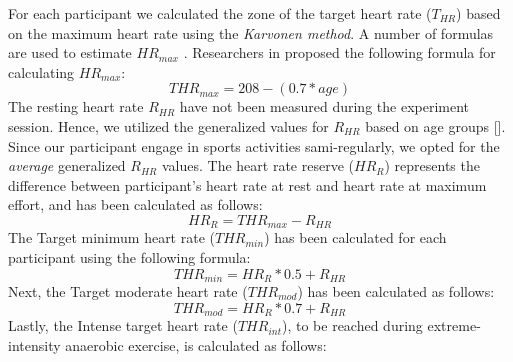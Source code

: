 For each participant we calculated the zone of the target heart rate (\begin{math} T_{HR}\end{math}) based on the maximum heart rate using the \textit{Karvonen method}. A number of formulas are used to estimate  \begin{math} HR_{max}\end{math} \cite{heartRate}. Researchers in \cite{tanaka2001age} proposed the following formula for calculating \begin{math}HR_{max}\end{math}:\\
\begin{equation}
THR_{max} = 208-(0.7 * age)
\end{equation}The resting heart rate \begin{math} R_{HR}\end{math} have not been measured during the experiment session. Hence, we utilized the generalized values for \begin{math} R_{HR}\end{math} based on age groups []. Since our participant engage in sports activities sami-regularly, we opted for the \textit{average} generalized \begin{math} R_{HR}\end{math} values. The heart rate reserve (\begin{math} HR_{R}\end{math}) represents the difference between participant's heart rate at rest and heart rate at maximum effort, and has been calculated as follows: \begin{equation}
HR_{R} = THR_{max} - R_{HR} 
\end{equation}The Target minimum heart rate (\begin{math} THR_{min}\end{math}) has been calculated for each participant using the following formula:\begin{equation}
THR_{min} =  HR_{R}*0.5 + R_{HR} 
\end{equation}
Next, the Target moderate heart rate (\begin{math} THR_{mod}\end{math}) has been calculated as follows:\begin{equation}
THR_{mod} =  HR_{R}*0.7 + R_{HR} 
\end{equation}Lastly, the Intense target heart rate (\begin{math} THR_{int}\end{math}), to be reached during extreme-intensity anaerobic exercise, is calculated as follows: 
